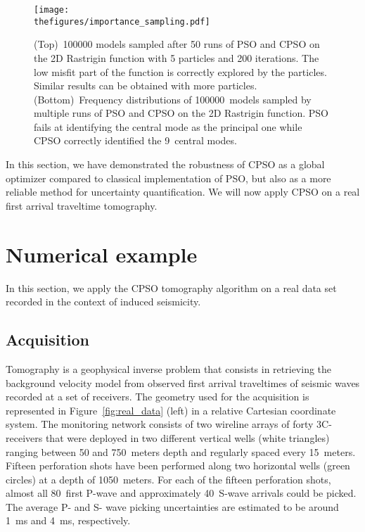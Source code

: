 \begin{figure}[!htbp]
	\centering
	\texttt{[image: \\thefigures/importance\_sampling.pdf]}
	\caption{(Top)~100000 models sampled after 50 runs of PSO and CPSO on the 2D Rastrigin function with 5 particles and 200 iterations. The low misfit part of the function is correctly explored by the particles. Similar results can be obtained with more particles. (Bottom)~Frequency distributions of 100000~models sampled by multiple runs of PSO and CPSO on the 2D Rastrigin function. PSO fails at identifying the central mode as the principal one while CPSO correctly identified the 9~central modes.}
    \label{fig:pdf}
\end{figure}

In this section, we have demonstrated the robustness of CPSO as a global optimizer compared to classical implementation of PSO, but also as a more reliable method for uncertainty quantification. We will now apply CPSO on a real first arrival traveltime tomography.


\section{Numerical example}
\label{sec:numerical_example}

In this section, we apply the CPSO tomography algorithm on a real data set recorded in the context of induced seismicity.


\subsection{Acquisition}
\label{ssec:acquisition}

Tomography is a geophysical inverse problem that consists in retrieving the background velocity model from observed first arrival traveltimes of seismic waves recorded at a set of receivers. The geometry used for the acquisition is represented in Figure~\ref{fig:real_data} (left) in a relative Cartesian coordinate system. The monitoring network consists of two wireline arrays of forty 3C-receivers that were deployed in two different vertical wells (white triangles) ranging between 50 and 750~meters depth and regularly spaced every 15~meters. Fifteen perforation shots have been performed along two horizontal wells (green circles) at a depth of 1050~meters. For each of the fifteen perforation shots, almost all 80~first P-wave and approximately 40~S-wave arrivals could be picked. The average P- and S- wave picking uncertainties are estimated to be around 1~ms and 4~ms, respectively.


